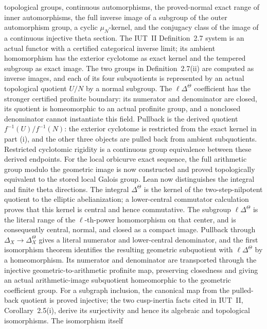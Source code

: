 \begin{definition}
  topological groups, continuous automorphisms, the proved-normal exact range
  of inner automorphisms, the full inverse image of a subgroup of the outer
  automorphism group, a cyclic \(\mu_N\)-kernel, and
  the conjugacy class of the image of a continuous injective theta section.
  The IUT~II Definition~2.7 system is an actual functor with a certified
  categorical inverse limit; its ambient homomorphism has the exterior
  cyclotome as exact kernel and the tempered subgroup as exact image.  The two
  groups in Definition~2.7(ii) are computed as inverse images, and each of its
  four subquotients is represented by an actual topological quotient \(U/N\)
  by a normal subgroup.  The \(\ell\Delta^\Theta\) coefficient has the stronger
  certified profinite boundary: its numerator and denominator are closed, its
  quotient is homeomorphic to an actual profinite group, and a nonclosed
  denominator cannot instantiate this field.  Pullback is the derived quotient
  \(f^{-1}(U)/f^{-1}(N)\): the exterior cyclotome is restricted from the exact
  kernel in part (i), and the other three objects are pulled back from ambient
  subquotients.  Restricted cyclotomic rigidity is a continuous group
  equivalence between these derived endpoints.  For the local orbicurve exact
  sequence, the full arithmetic group modulo the geometric image is now
  constructed and proved topologically equivalent to the stored local Galois
  group.  Lean now distinguishes the integral and finite theta directions.
  The integral \(\Delta^\Theta\) is the kernel of the two-step-nilpotent
  quotient to the elliptic abelianization; a lower-central commutator
  calculation proves that this kernel is central and hence commutative.  The
  subgroup \(\ell\Delta^\Theta\) is the literal range of the \(\ell\)-th-power
  homomorphism on that center, and is consequently central, normal, and closed
  as a compact image.  Pullback
  through \(\Delta_X\to\Delta_X^\Theta\) gives a literal numerator and
  lower-central denominator, and the first isomorphism theorem identifies the
  resulting geometric subquotient with \(\ell\Delta^\Theta\) by a
  homeomorphism.  Its numerator and denominator are transported through the
  injective geometric-to-arithmetic profinite map, preserving closedness and
  giving an actual arithmetic-image subquotient homeomorphic to the geometric
  coefficient group.  For a subgraph inclusion,
  the canonical map from the pulled-back quotient is proved injective; the two
  cusp-inertia facts cited in IUT~II, Corollary~2.5(i), derive its surjectivity
  and hence its algebraic and topological isomorphisms.  The isomorphism itself

\end{definition}
